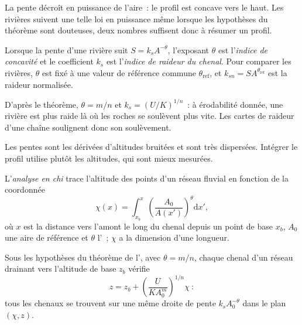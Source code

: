 La pente décroît en puissance de l'aire~: le profil est concave vers le haut. Les
rivières suivent une telle loi en puissance même lorsque les hypothèses du théorème sont
douteuses, deux nombres suffisent donc à résumer un profil.

\begin{definition}\label{def:b3:quantitative-geomorphology:indices}
Lorsque la pente d'une rivière suit $S = k_s A^{-\theta}$, l'exposant
$\theta$ est l'\emph{indice de concavité} et le
coefficient $k_s$ est l'\emph{indice de raideur du chenal}.
Pour comparer les rivières, $\theta$ est fixé à une valeur de référence commune
$\theta_{\mathrm{ref}}$, et $k_{sn} = S A^{\theta_{\mathrm{ref}}}$ est la
raideur normalisée.
\end{definition}

D'après le théorème, $\theta = m/n$ et $k_s = (U/K)^{1/n}$~: à érodabilité
donnée, une rivière est plus raide là où les roches se soulèvent plus vite. Les cartes de raideur
d'une chaîne soulignent donc son soulèvement.


Les pentes sont les dérivées d'altitudes bruitées et sont très dispersées. Intégrer
le profil utilise plutôt les altitudes, qui sont mieux mesurées.

\begin{definition}\label{def:b3:quantitative-geomorphology:chi}
L'\emph{analyse en chi} trace l'altitude des points
d'un réseau fluvial en fonction de la coordonnée
\[
\chi(x) = \int_{x_b}^{x} \left(\frac{A_0}{A(x')}\right)^{\theta}
\mathrm{d}x' ,
\]
où $x$ est la distance vers l'amont le long du chenal depuis un point de base
$x_b$, $A_0$ une aire de référence et $\theta$ l'~; $\chi$ a
la dimension d'une longueur.
\end{definition}

\begin{proposition}\label{prop:b3:quantitative-geomorphology:chi}
Sous les hypothèses du théorème de l', avec $\theta = m/n$,
chaque chenal d'un réseau drainant vers l'altitude de base $z_b$ vérifie
\[
z = z_b + \left(\frac{U}{K A_0^{m}}\right)^{1/n} \chi~:
\]
tous les chenaux se trouvent sur une même droite de pente $k_s A_0^{-\theta}$ dans
le plan $(\chi, z)$.
\end{proposition}

